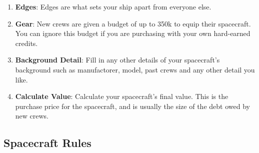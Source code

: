 \begin{multicols}{2}
\begin{enumerate}
  \item \textbf{Edges}: Edges are what sets your ship apart from everyone else.

  \item \textbf{Gear}: New crews are given a budget of up to 350k to equip their spacecraft. You can ignore this budget if you are purchasing with your own hard-earned credits.

  \item \textbf{Background Detail}: Fill in any other details of your spacecraft's background such as manufactorer, model, past crews and any other detail you like.
  
  \item \textbf{Calculate Value}: Calculate your spacecraft's final value. This is the purchase price for the spacecraft, and is usually the size of the debt owed by new crews.

\end{enumerate}

\subsection{Spacecraft Rules}


\end{multicols}
